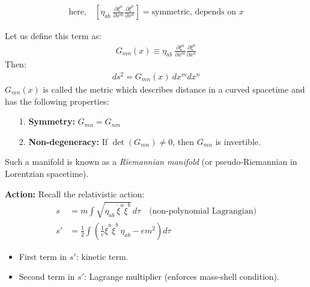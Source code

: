 \documentclass[14pt]{article} %
\begin{document}
\begin{align*}\text{here,}\quad
\left[ \eta_{ab}~ \frac{\partial \xi^a}{\partial x^m} \frac{\partial \xi^b}{\partial x^n} \right] = \text{symmetric, depends on } x
\end{align*}

Let us define this term as:
\begin{align*}
G_{mn}(x) \equiv \eta_{ab}~ \frac{\partial \xi^a}{\partial x^m} \frac{\partial \xi^b}{\partial x^n}
\end{align*}
Then:
\begin{align*}
ds^2 = G_{mn}(x)~dx^m dx^n
\end{align*}
$G_{mn}(x)$ is called the metric which describes distance in a curved spacetime and has the following properties:
\begin{itemize}
    \item[1.] \textbf{Symmetry:} $G_{mn} = G_{nm}$
    \item[2.] \textbf{Non-degeneracy:} If $\det(G_{mn}) \neq 0$, then $G_{mn}$ is invertible.
\end{itemize}
Such a manifold is known as a \textit{Riemannian manifold} (or pseudo-Riemannian in Lorentzian spacetime).

\vspace{1em}
\noindent
\textbf{Action:} Recall the relativistic action:
\begin{align*}
    s &= m \int \sqrt{ \eta_{ab}~ \dot{\xi}^a \dot{\xi}^b } \, d\tau 
    \quad \text{(non-polynomial Lagrangian)} \\
    s' &= \frac{1}{2} \int \left( \frac{1}{e} \dot{\xi}^a \dot{\xi}^b~ \eta_{ab} - e m^2 \right) d\tau 
\end{align*}

\begin{itemize}
    \item First term in $s'$: kinetic term.
    \item Second term in $s'$: Lagrange multiplier (enforces mass-shell condition).
\end{itemize}
\end{document}
